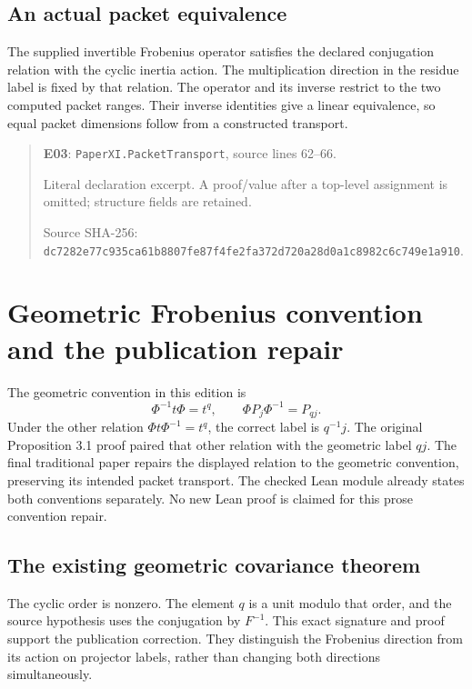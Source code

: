 \documentclass[10pt,oneside]{book}
\begin{document}

\subsection{An actual packet equivalence}
\label{guide:E03}
The supplied invertible Frobenius operator satisfies the declared conjugation relation with the cyclic inertia action. The multiplication direction in the residue label is fixed by that relation.
The operator and its inverse restrict to the two computed packet ranges. Their inverse identities give a linear equivalence, so equal packet dimensions follow from a constructed transport.

\begin{quote}\footnotesize\textbf{E03}: \nolinkurl{PaperXI.PacketTransport}, source lines 62--66.\par Literal declaration excerpt. A proof/value after a top-level assignment is omitted; structure fields are retained.\par Source SHA-256: {\scriptsize\texttt{dc7282e77c935ca61b8807fe87f4fe2fa372d720a28d0a1c8982c6c749e1a910}}.\end{quote}


\section{Geometric Frobenius convention and the publication repair}
The geometric convention in this edition is
\[
 \Phi^{-1}t\Phi=t^q,
 \qquad \Phi P_j\Phi^{-1}=P_{qj}.
\]
Under the other relation \(\Phi t\Phi^{-1}=t^q\), the correct label is \(q^{-1}j\). The original Proposition 3.1 proof paired that other relation with the geometric label \(qj\). The final traditional paper repairs the displayed relation to the geometric convention, preserving its intended packet transport. The checked Lean module already states both conventions separately. No new Lean proof is claimed for this prose convention repair.

\subsection{The existing geometric covariance theorem}
\label{guide:E04}
The cyclic order is nonzero. The element \(q\) is a unit modulo that order, and the source hypothesis uses the conjugation by \(F^{-1}\).
This exact signature and proof support the publication correction. They distinguish the Frobenius direction from its action on projector labels, rather than changing both directions simultaneously.
\end{document}
